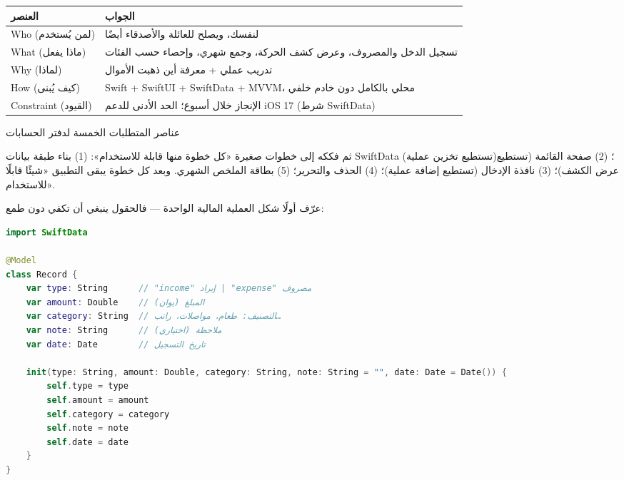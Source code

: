 


\begin{center}
\begin{tabularx}{\linewidth}{|X|X|}
\hline
\textbf{العنصر} & \textbf{الجواب} \tabularnewline
\hline
Who (لمن يُستخدم) & لنفسك، ويصلح للعائلة والأصدقاء أيضًا \tabularnewline
What (ماذا يفعل) & تسجيل الدخل والمصروف، وعرض كشف الحركة، وجمع شهري، وإحصاء حسب الفئات \tabularnewline
Why (لماذا) & تدريب عملي + معرفة أين ذهبت الأموال \tabularnewline
How (كيف يُبنى) & Swift + SwiftUI + SwiftData + MVVM، محلي بالكامل دون خادم خلفي \tabularnewline
Constraint (القيود) & الإنجاز خلال أسبوع؛ الحد الأدنى للدعم iOS 17 (شرط SwiftData) \tabularnewline
\hline
\end{tabularx}
\end{center}

\begin{center}\small\color{gray}عناصر المتطلبات الخمسة لدفتر الحسابات\end{center}

ثم فككه إلى خطوات صغيرة «كل خطوة منها قابلة للاستخدام»: (1) بناء طبقة بيانات SwiftData (تستطيع تخزين عملية)؛ (2) صفحة القائمة (تستطيع عرض الكشف)؛ (3) نافذة الإدخال (تستطيع إضافة عملية)؛ (4) الحذف والتحرير؛ (5) بطاقة الملخص الشهري. وبعد كل خطوة يبقى التطبيق «شيئًا قابلًا للاستخدام».


عرّف أولًا شكل العملية المالية الواحدة — فالحقول ينبغي أن تكفي دون طمع:

\begin{lstlisting}[language=Swift]
import SwiftData

@Model
class Record {
    var type: String      // "income" إيراد | "expense" مصروف
    var amount: Double    // المبلغ (يوان)
    var category: String  // التصنيف: طعام، مواصلات، راتب…
    var note: String      // ملاحظة (اختياري)
    var date: Date        // تاريخ التسجيل

    init(type: String, amount: Double, category: String, note: String = "", date: Date = Date()) {
        self.type = type
        self.amount = amount
        self.category = category
        self.note = note
        self.date = date
    }
}
\end{lstlisting}

